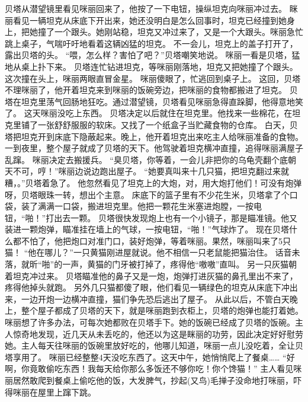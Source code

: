 \documentclass[a4paper,12pt,UTF8,twoside]{ctexbook}
\begin{document}
        贝塔从潜望镜里看见咪丽回来了，他按了一下电钮，操纵坦克向咪丽冲过去。 
        眯丽看见一辆坦克从床底下开出来，她还没明白是怎么回事时，坦克已经撞到她身上，把她撞了一个跟头。她刚站稳，坦克又冲过来了，又是一个大跟头。咪丽急忙跳上桌子，气喘吁吁地看着这辆凶猛的坦克。 
        不一会儿，坦克上的盖子打开了，露出贝塔的头。 
        “喂，怎么样？害怕了吧？”贝塔嘲笑地说。 
        咪丽一看是贝塔，猛地从桌上扑下来。 
        贝塔连忙钻进坦克，等咪丽刚落地，坦克又把她撞了个跟头。这次撞在头上，咪丽两眼直冒金星。 
        咪丽傻眼了，忙逃回到桌子上。 
        这回，贝塔不理咪丽了，他开着坦克来到咪丽的饭碗旁边，把咪丽的食物都搬进了坦克。 
        贝塔在坦克里荡气回肠地狂吃。通过潜望镜，贝塔看见咪丽急得直跺脚，他得意地笑了。 
        这天咪丽没吃上东西。 
        贝塔决定以后就住在坦克里。他找来一些棉花，在坦克里铺了一张舒舒服服的软床。又找了一个纸盒子当贮藏食物的仓库。 
        白天，贝塔把坦克开到床底下隐蔽起来。晚上，他开着坦克出来吃主人给咪丽准备的食物。 
        一到夜里，整个屋子就成了贝塔的天下。他驾驶着坦克横冲直撞，追得咪丽满屋子乱蹿。 
       咪丽决定去搬援兵。 
      “臭贝塔，你等着，一会儿非把你的乌龟壳翻个底朝天不可，哼！”咪丽边说边跑出屋子。 
        “她要真叫来十几只猫，把坦克翻过来就糟，。”贝塔着急了。 
        他忽然看见了坦克上的大炮，对，用大炮打他们！可没有炮弹呀，贝塔眼珠一转，想出个主意。 
        床底下的篮子里有不少花生米，贝塔拿了个口袋，装了满满一口袋，搬进坦克里。他把一颗花生米塞进炮膛，一按电钮，“啪！”打出去一颗。 
        贝塔很快发现炮上也有一个小镜子，那是瞄准镜。他又装进一颗炮弹，瞄准挂在墙上的气球，一按电钮，“啪！”气球炸了。 
        现在贝塔什么都不怕了，他把炮口对准门口，装好炮弹，等着咪丽。果然，咪丽叫来了5只猫！ 
        “他在哪儿？”一只黄猫刚进屋就说。他不相信一只老鼠能把猫治住。 
        话音未落，就昕“啪”的一声，黄猫的门牙被打掉了，疼得他“嗷嗷”直叫。 
        另一只灰猫朝着坦克冲过来。 
        贝塔瞄准他的鼻子又是一炮，炮弹打进灰猫的鼻孔里出不来了，疼得他掉头就跑。 
        另外几只猫都傻了眼，他们看见一辆绿色的坦克从床底下冲出来，一边开炮一边横冲直撞，猫们争先恐后逃出了屋子。 
        从此以后，不管白天晚上，整个屋子都成了贝塔的天下，就是咪丽跑到衣柜上，贝塔的炮弹也能打着她。 
        咪丽想了许多办法，可每次她都败在贝塔手下。她的饭碗已经成了贝塔的饭碗。主人惊奇地发现，近几天从未丢吃的，他还以为这是眯丽的功劳，因此决定好好慰劳她。主人每天往咪丽的饭碗里放好吃的，他哪儿知道，咪丽一点儿没吃着，全让贝塔享用了。 
        咪丽已经整整4天没吃东西了。这天中午，她悄悄爬上了餐桌…… 
        “好啊，你竟敢偷吃东西！我每天给你那么多饭还不够你吃！你个馋猫！” 
        主人看见咪丽居然敢爬到餐桌上偷吃他的饭，大发脾气，抄起(又鸟)毛掸子没命地打咪丽，吓得咪丽在屋里上蹿下跳。 
\end{document}
